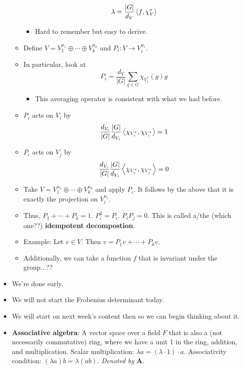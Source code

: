\documentclass[../notes.tex]{subfiles}
\begin{document}
\begin{itemize}
\begin{itemize}
\begin{equation*}
            \lambda = \frac{|G|}{d_V}\left\langle{f,\chi_V^*}\right\rangle
        \end{equation*}
        \begin{itemize}
            \item Hard to remember but easy to derive.
        \end{itemize}
        \item Define $V=V_1^{n_1}\oplus\cdots\oplus V_k^{n_k}$ and $P_i:V\to V_i^{n_i}$.
        \item In particular, look at
        \begin{equation*}
            P_i = \frac{d_V}{|G|}\sum_{g\in G}\chi_{V_i^*}(g)g
        \end{equation*}
        \begin{itemize}
            \item This averaging operator is consistent with what we had before.
        \end{itemize}
        \item $P_i$ acts on $V_i$ by
        \begin{equation*}
            \frac{d_{V_i}}{|G|}\frac{|G|}{d_{V_i}}\left\langle{\chi_{V_i^*},\chi_{V_i^*}}\right\rangle = 1
        \end{equation*}
        \item $P_i$ acts on $V_j$ by
        \begin{equation*}
            \frac{d_{V_i}}{|G|}\frac{|G|}{d_{V_i}}\left\langle{\chi_{V_i^*},\chi_{V_j^*}}\right\rangle = 0
        \end{equation*}
        \item Take $V=V_1^{n_1}\oplus\cdots\oplus V_k^{n_k}$ and apply $P_i$. It follows by the above that it is exactly the projection on $V_i^{n_i}$.
        \item Thus, $P_1+\cdots+P_k=1$. $P_i^2=P_i$. $P_iP_j=0$. This is called a/the (which one??) \textbf{idempotent decompostion}.
        \item Example: Let $v\in V$. Then $v=P_1v+\cdots+P_kv$.
        \item Additionally, we can take a function $f$ that is invariant under the group...??
    \end{itemize}
    \item We're done early.
    \item We will not start the Frobenius determinant today.
    \item We will start on next week's content then so we can begin thinking about it.
    \item \textbf{Associative algebra}: A vector space over a field $F$ that is also a (not necessarily commutative) ring, where we have a unit 1 in the ring, addition, and multiplication. Scalar multiplication: $\lambda a=(\lambda\cdot 1)\cdot a$. Associativity condition: $(\lambda a)b=\lambda(ab)$. \emph{Denoted by} $\bm{A}$.

\end{itemize}
\end{document}
